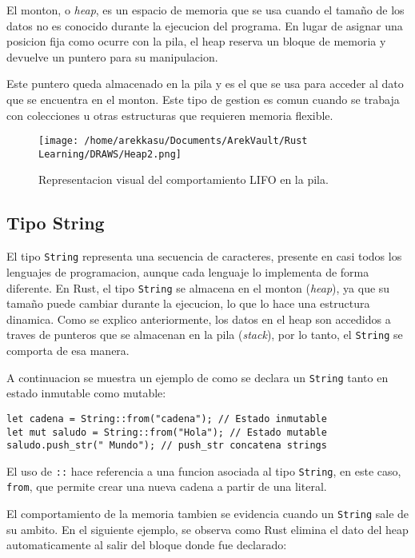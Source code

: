\documentclass[12pt]{article}
\begin{document}
El monton, o \textit{heap}, es un espacio de memoria que se usa cuando el tamaño de los datos no es conocido durante la ejecucion del programa. En lugar de asignar una posicion fija como ocurre con la pila, el heap reserva un bloque de memoria y devuelve un puntero para su manipulacion.

Este puntero queda almacenado en la pila y es el que se usa para acceder al dato que se encuentra en el monton. Este tipo de gestion es comun cuando se trabaja con colecciones u otras estructuras que requieren memoria flexible.


\begin{figure}[H]
	\centering
	\texttt{[image: /home/arekkasu/Documents/ArekVault/Rust Learning/DRAWS/Heap2.png]}
	\caption{Representacion visual del comportamiento LIFO en la pila.}
\end{figure}

\subsection{Tipo String}

El tipo \texttt{String} representa una secuencia de caracteres, presente en casi todos los lenguajes de programacion, aunque cada lenguaje lo implementa de forma diferente. En Rust, el tipo \texttt{String} se almacena en el monton (\textit{heap}), ya que su tamaño puede cambiar durante la ejecucion, lo que lo hace una estructura dinamica. Como se explico anteriormente, los datos en el heap son accedidos a traves de punteros que se almacenan en la pila (\textit{stack}), por lo tanto, el \texttt{String} se comporta de esa manera.

A continuacion se muestra un ejemplo de como se declara un \texttt{String} tanto en estado inmutable como mutable:

\begin{lstlisting}[style=ruststyle]
let cadena = String::from("cadena"); // Estado inmutable
let mut saludo = String::from("Hola"); // Estado mutable
saludo.push_str(" Mundo"); // push_str concatena strings
\end{lstlisting}

El uso de \texttt{::} hace referencia a una funcion asociada al tipo \texttt{String}, en este caso, \texttt{from}, que permite crear una nueva cadena a partir de una literal.

El comportamiento de la memoria tambien se evidencia cuando un \texttt{String} sale de su ambito. En el siguiente ejemplo, se observa como Rust elimina el dato del heap automaticamente al salir del bloque donde fue declarado:
\end{document}
